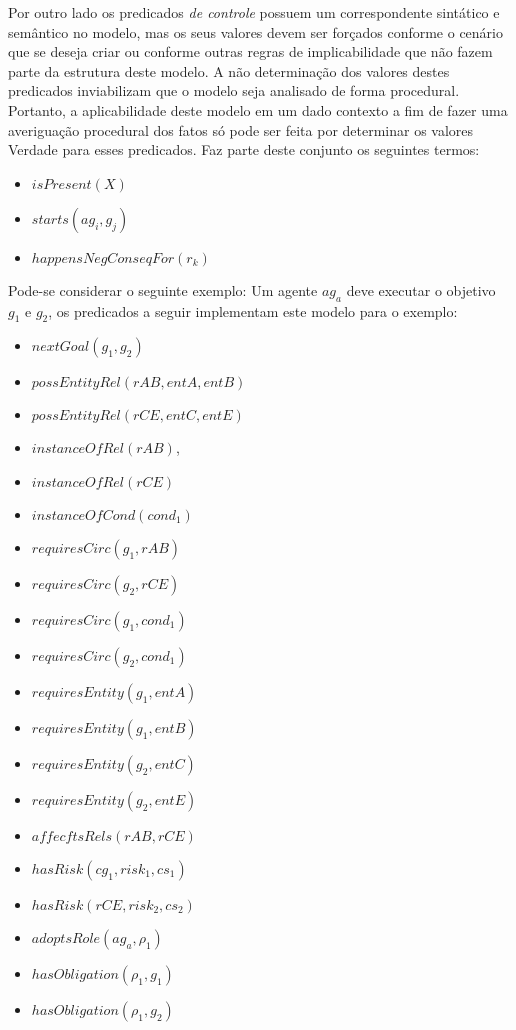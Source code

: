 Por outro lado os predicados \textit{de controle} possuem um correspondente sintático e semântico no modelo, mas os seus valores devem ser forçados conforme o cenário que se deseja criar ou conforme outras regras de implicabilidade que não fazem parte da estrutura deste modelo. A não determinação dos valores destes predicados inviabilizam que o modelo seja analisado de forma procedural. Portanto, a aplicabilidade deste modelo em um dado contexto a fim de fazer uma averiguação procedural dos fatos só pode ser feita por determinar os valores Verdade para esses predicados. Faz parte deste conjunto os seguintes termos: 

\begin{itemize}
    \item $isPresent(X)$
    \item $starts(ag_i,g_j)$
    \item $happensNegConseqFor(r_k)$
\end{itemize}

Pode-se considerar o seguinte exemplo: Um agente $ag_a$ deve executar o objetivo $g_1$ e $g_2$, os predicados a seguir implementam este modelo para o exemplo:

\begin{itemize}
    \item $nextGoal(g_1,g_2)$
    \item $possEntityRel(rAB,entA,entB)$
    \item $possEntityRel(rCE,entC,entE)$
    \item $instanceOfRel(rAB)$,
    \item $instanceOfRel(rCE) $
    \item $instanceOfCond(cond_1)$
    \item $requiresCirc(g_1,rAB)$
    \item $requiresCirc(g_2,rCE)$
    \item $requiresCirc(g_1,cond_1)$
    \item $requiresCirc(g_2,cond_1)$    
    \item $requiresEntity(g_1,entA)$
    \item $requiresEntity(g_1,entB)$
    \item $requiresEntity(g_2,entC)$
    \item $requiresEntity(g_2,entE)$            
    \item $affecftsRels(rAB,rCE) $ 
    \item $hasRisk(cg_1,risk_1,cs_1)$
    \item $hasRisk(rCE,risk_2,cs_2)$
    \item $adoptsRole(ag_a,\rho_1)$
    \item $hasObligation(\rho_1,g_1)$
    \item $hasObligation(\rho_1,g_2)$
\end{itemize}

